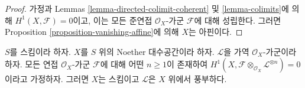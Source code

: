 \begin{proof}
가정과 Lemmas \ref{lemma-directed-colimit-coherent} 및
\ref{lemma-colimits}에 의해 $H^1(X, \mathcal{F}) = 0$이고, 이는 모든
준연접 $\mathcal{O}_X$-가군 $\mathcal{F}$에 대해 성립한다. 그러면 Proposition
\ref{proposition-vanishing-affine}에 의해 $X$는 아핀이다.
\end{proof}

\begin{lemma}
\label{lemma-Noetherian-h1-zero-invertible}
$S$를 스킴이라 하자. $X$를 $S$ 위의 Noether 대수공간이라 하자.
$\mathcal{L}$을 가역 $\mathcal{O}_X$-가군이라 하자. 모든 연접
$\mathcal{O}_X$-가군 $\mathcal{F}$에 대해 어떤 $n \geq 1$이 존재하여
$H^1(X, \mathcal{F} \otimes_{\mathcal{O}_X} \mathcal{L}^{\otimes n}) = 0$
이라고 가정하자. 그러면 $X$는 스킴이고 $\mathcal{L}$은 $X$ 위에서
풍부하다.
\end{lemma}


